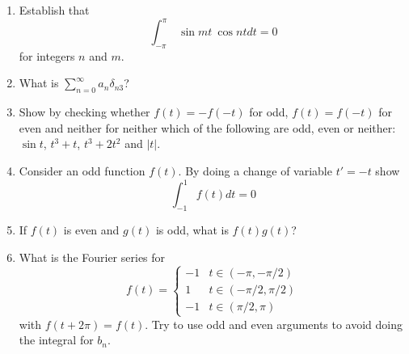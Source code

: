 \documentclass[12pt]{article}
\begin{document}
\begin{enumerate}

\item Establish that
\begin{equation}
\int^\pi_{-\pi}~ \sin mt ~\cos nt dt=0
\end{equation}
for integers $n$ and $m$.

\item What is $\sum_{n=0}^\infty a_n\delta_{n3}$?

\item Show by checking whether $f(t)=-f(-t)$ for odd, $f(t)=f(-t)$ for even and neither for neither which of the following are odd, even or neither: $\sin{t}$, $t^3+t$, $t^3+2t^2$ and $|t|$.

\item Consider an odd function $f(t)$. By doing a change of variable
  $t'=-t$ show 
 \begin{equation}
\int_{-1}^1f(t)dt=0
\end{equation}

\item If $f(t)$ is even and $g(t)$ is odd, what is $f(t)g(t)$?

\item What is the Fourier series for 
\begin{equation}
f(t)=\left\{\begin{array}{ll}-1&t\in(-\pi,-\pi/2)\\
                             1 &t\in(-\pi/2,\pi/2)\\
                             -1&t\in(\pi/2,\pi)
\end{array}\right.
\end{equation}
with $f(t+2\pi)=f(t)$. Try to use odd and even arguments to avoid
doing the integral for $b_n$.


\end{enumerate}
\end{document}
